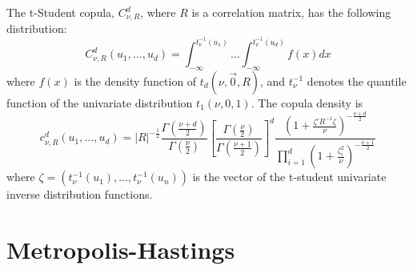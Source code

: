 \documentclass[11pt,fleqn]{book} %
\begin{document}
\begin{proposition}
The t-Student copula, $C_{\nu,R}^d$, where $R$ is a correlation matrix,
has the following distribution:
\begin{displaymath}
C_{\nu,R}^d(u_1, \dots, u_d) = 
\int_{-\infty}^{t_\nu^{-1}(u_1)} \dots \int_{-\infty}^{t_\nu^{-1}(u_d)} f(x) dx
\end{displaymath}
where $f(x)$ is the density function of $t_d(\nu,\vec{0},R)$, and $t_{\nu}^{-1}$ denotes the 
quantile function of the univariate distribution $t_1(\nu,0,1)$. 
The copula density is
\begin{displaymath}
\label{eq:density}
c_{\nu,R}^d(u_1,\dots,u_d) = %
|R|^{-\frac{1}{2}} 
\displaystyle\frac{\Gamma{\left(\frac{\nu+d}{2}\right)}}{\Gamma{\left(\frac{\nu}{2}\right)}}
\displaystyle\left[ \frac{\Gamma{\left(\frac{\nu}{2}\right)}}{\Gamma{\left(\frac{\nu+1}{2}\right)}} \right]^d
\frac{\displaystyle\left( 1+\frac{\zeta' R^{-1} \zeta}{\nu}\right)^{-\frac{\nu+d}{2}}}{\displaystyle\prod_{i=1}^d \left( 1+\frac{\zeta_i^2}{\nu} \right)^{-\frac{\nu+1}{2}}}
\end{displaymath}
\noindent
where $\zeta=(t_\nu^{-1}(u_1), \dots, t_\nu^{-1}(u_n))$ is the vector of the t-student 
univariate inverse distribution functions.
\end{proposition}
\begin{comment}
\begin{proof}
see ageeva
\end{proof}
\end{comment}


\section{Metropolis-Hastings}
\end{document}
